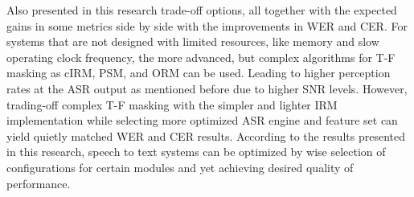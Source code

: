 \bigskip

Also presented in this research trade-off options,
all together with the expected gains in some metrics
side by side with the improvements in WER and CER.
For systems that are not designed with limited resources,
like memory and slow operating clock frequency, 
the more advanced, but complex algorithms for T-F masking
as cIRM, PSM, and ORM can be used.
Leading to higher perception rates at the ASR output
as mentioned before due to higher SNR levels. However,
trading-off complex T-F masking with the simpler and
lighter IRM implementation while selecting more optimized
ASR engine and feature set can yield quietly matched
WER and CER results. According to the results presented
in this research, speech to text systems can be optimized
by wise selection 
of configurations for certain
modules and yet achieving desired quality of performance.
